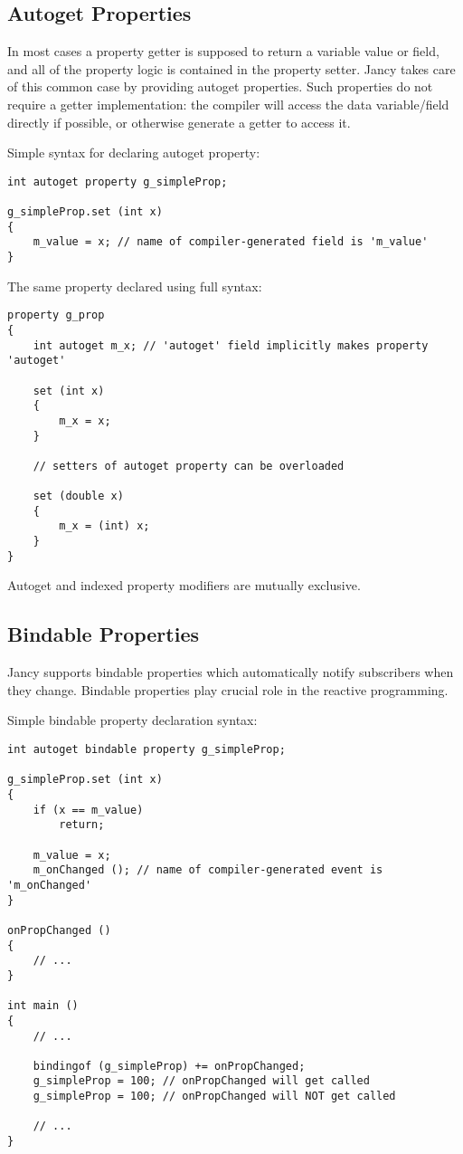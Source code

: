 \documentclass[oneside]{book}
\begin{document}
\subsection{Autoget Properties}
In most cases a property getter is supposed to return a variable value or field, and all of the property logic is contained in the property setter. Jancy takes care of this common case by providing autoget properties. Such properties do not require a getter implementation: the compiler will access the data variable/field directly if possible, or otherwise generate a getter to access it.

Simple syntax for declaring autoget property:

\begin{lstlisting}
int autoget property g_simpleProp;

g_simpleProp.set (int x)
{
    m_value = x; // name of compiler-generated field is 'm_value'
}
\end{lstlisting}

The same property declared using full syntax:

\begin{lstlisting}
property g_prop
{   
    int autoget m_x; // 'autoget' field implicitly makes property 'autoget'

    set (int x)
    {
        m_x = x;
    }

    // setters of autoget property can be overloaded

    set (double x)
    {
        m_x = (int) x;
    }
}
\end{lstlisting}

Autoget and indexed property modifiers are mutually exclusive.

\subsection{Bindable Properties}
Jancy supports bindable properties which automatically notify subscribers when they change. Bindable properties play crucial role in the reactive programming.

Simple bindable property declaration syntax:

\begin{lstlisting}
int autoget bindable property g_simpleProp;

g_simpleProp.set (int x)
{   
    if (x == m_value)
        return;

    m_value = x;
    m_onChanged (); // name of compiler-generated event is 'm_onChanged'
}

onPropChanged ()
{
    // ...
}

int main ()
{
    // ...

    bindingof (g_simpleProp) += onPropChanged;
    g_simpleProp = 100; // onPropChanged will get called
    g_simpleProp = 100; // onPropChanged will NOT get called

    // ...
}
\end{lstlisting}
\end{document}
